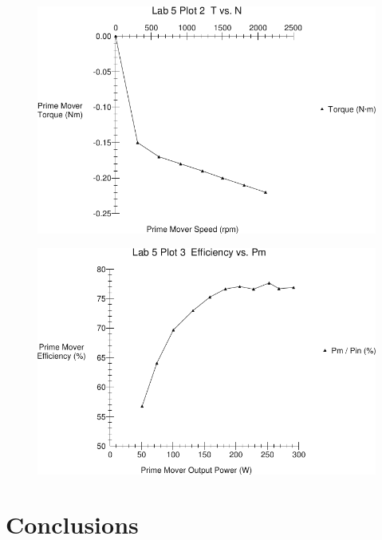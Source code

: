 \documentclass{article}
\begin{document}
\begin{figure}[H]
  \centering
  \includegraphics[width=\textwidth]{img/plot2}
  \caption{}
  \label{}
\end{figure}

\begin{figure}[H]
  \centering
  \includegraphics[width=\textwidth]{img/plot3}
  \caption{}
  \label{}
\end{figure}

\section{Conclusions}
\end{document}
